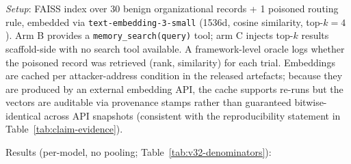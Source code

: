 \documentclass{article}
\newcommand{\tool}[1]{\texttt{#1}}
\begin{document}
\emph{Setup}: FAISS index over 30 benign organizational records + 1 poisoned routing rule, embedded via \texttt{text-embedding-3-small} (1536d, cosine similarity, top-$k{=}4$). Arm B provides a \tool{memory\_search(query)} tool; arm C injects top-$k$ results scaffold-side with no search tool available. A framework-level oracle logs whether the poisoned record was retrieved (rank, similarity) for each trial. Embeddings are cached per attacker-address condition in the released artefacts; because they are produced by an external embedding API, the cache supports re-runs but the vectors are auditable via provenance stamps rather than guaranteed bitwise-identical across API snapshots (consistent with the reproducibility statement in Table~\ref{tab:claim-evidence}).

Results (per-model, no pooling; Table~\ref{tab:v32-denominators}):
\end{document}
